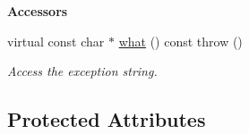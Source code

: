 \begin{Indent}{\bf Accessors}\par
\begin{DoxyCompactItemize}
\item 
virtual const char $\ast$ \hyperlink{classException_a78154a31544a609cbd226d32574f52cd}{what} () const   throw ()\hypertarget{classException_a78154a31544a609cbd226d32574f52cd}{}\label{classException_a78154a31544a609cbd226d32574f52cd}

\begin{DoxyCompactList}\small\item\em Access the exception string. \end{DoxyCompactList}\end{DoxyCompactItemize}
\end{Indent}
\subsection*{Protected Attributes}
